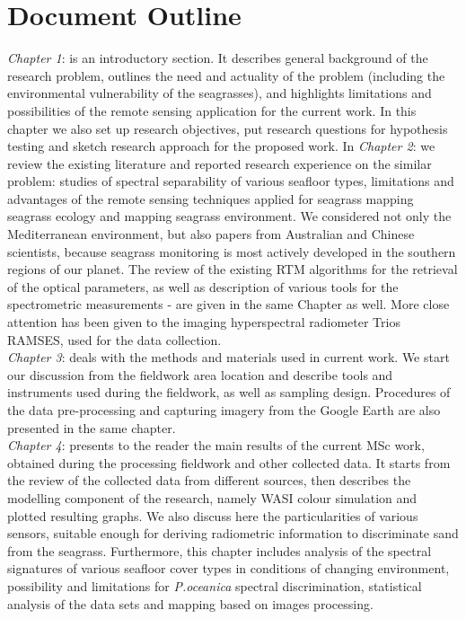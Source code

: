 \documentclass[11pt]{article}
\begin{document}
\section*{Document Outline}
\textit{Chapter 1}:  is an introductory section. It describes general background of the research problem, outlines the need and actuality of the problem (including the environmental vulnerability of the seagrasses), and highlights limitations and possibilities of the remote sensing application for the current work. In this chapter we also set up research objectives, put research questions for hypothesis testing and sketch research approach for the proposed work.
\newline
In \textit{Chapter 2}:  we review the existing literature and reported research experience on the similar problem: studies of spectral separability of various seafloor types, limitations and advantages of the remote sensing techniques applied for seagrass mapping seagrass ecology and mapping seagrass environment. We considered not only the Mediterranean environment, but also papers from Australian and Chinese scientists, because seagrass monitoring is most actively developed in the southern regions of our planet. The review of the existing RTM algorithms for the retrieval of the optical parameters, as well as description of various tools for the spectrometric measurements - are given in the same Chapter as well. More close attention has been given to the imaging hyperspectral radiometer Trios RAMSES, used for the data collection.\\
\textit{Chapter 3}:  deals with the methods and materials used in current work. We start our discussion from the fieldwork area location and describe tools and instruments used during the fieldwork, as well as sampling design. Procedures of the data pre-processing and capturing imagery from the Google Earth are also presented in the same chapter. \\
\textit{Chapter 4}:  presents to the reader the main results of the current MSc work, obtained during the processing fieldwork and other collected data. It starts from the review of the collected data from different sources, then describes the modelling component of the research, namely \ac{WASI} colour simulation and plotted resulting graphs. We also discuss here the particularities of various sensors, suitable enough for deriving radiometric information to discriminate sand from the seagrass. Furthermore, this chapter includes analysis of the spectral signatures of various seafloor cover types in conditions of changing environment, possibility and limitations for \textit{P.oceanica} spectral discrimination, statistical analysis of the data sets and mapping based on images processing.\\
\end{document}
